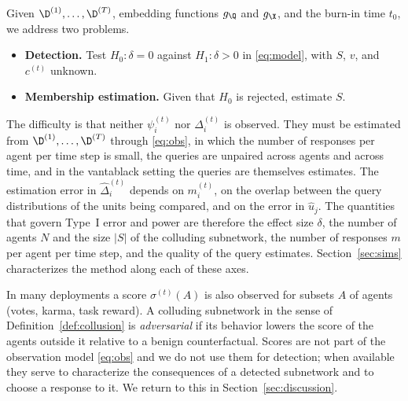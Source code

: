Given $\D^{(1)},\dots,\D^{(T)}$, embedding functions $g_\Q$ and $g_\X$, and the burn-in time $t_0$, we address two problems.

\begin{itemize}
  \item[\textbf{P0}] \textbf{Detection.} Test $H_0:\delta=0$ against $H_1:\delta>0$ in \eqref{eq:model}, with $S$, $v$, and $c^{(t)}$ unknown.
  \item[\textbf{P1}] \textbf{Membership estimation.} Given that $H_0$ is rejected, estimate $S$.
\end{itemize}

The difficulty is that neither $\psi_i^{(t)}$ nor $\Delta_i^{(t)}$ is observed. They must be estimated from $\D^{(1)},\dots,\D^{(T)}$ through \eqref{eq:obs}, in which the number of responses per agent per time step is small, the queries are unpaired across agents and across time, and in the vantablack setting the queries are themselves estimates. The estimation error in $\hat\Delta_i^{(t)}$ depends on $m_i^{(t)}$, on the overlap between the query distributions of the units being compared, and on the error in $\hat u_j$. The quantities that govern Type~I error and power are therefore the effect size $\delta$, the number of agents $N$ and the size $|S|$ of the colluding subnetwork, the number of responses $m$ per agent per time step, and the quality of the query estimates. Section~\ref{sec:sims} characterizes the method along each of these axes.

\begin{remark}[Scores]
In many deployments a score $\sigma^{(t)}(A)$ is also observed for subsets $A$ of agents (votes, karma, task reward). A colluding subnetwork in the sense of Definition~\ref{def:collusion} is \emph{adversarial} if its behavior lowers the score of the agents outside it relative to a benign counterfactual. Scores are not part of the observation model \eqref{eq:obs} and we do not use them for detection; when available they serve to characterize the consequences of a detected subnetwork and to choose a response to it. We return to this in Section~\ref{sec:discussion}.
\end{remark}
